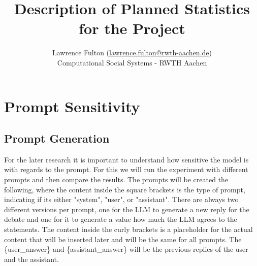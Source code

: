 \documentclass[12pt]{article}
\title{Description of Planned Statistics for the Project}
\author{Lawrence Fulton (\url{lawrence.fulton@rwth-aachen.de})\\ Computational Social Systems -  RWTH Aachen}
\begin{document}
\maketitle


\section{Prompt Sensitivity}
\subsection{Prompt Generation}
For the later research it is important to understand how sensitive the model is with regards to the prompt. For this we will run the experiment with different prompts and then compare the results. The prompts will be created the following, where the content inside the square brackets is the type of prompt, indicating if its either "system", "user", or "assistant". There are always two different versions per prompt, one for the LLM to generate a new reply for the debate and one for it to generate a value how much the LLM agrees to the statements.
The content inside the curly brackets is a placeholder for the actual content that will be inserted later and will be the same for all prompts. The \{user\_answer\} and \{assistant\_answer\} will be the previous replies of the user and the assistant.
\end{document}
